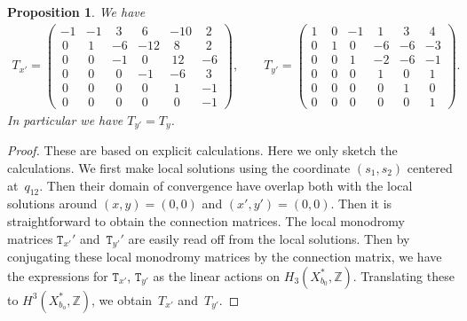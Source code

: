 \documentclass[10pt,a4paper]{amsart}
\numberwithin{equation}{section}
\newtheorem{Proposition}[Theorem]{Proposition}
\begin{document}
\begin{Proposition}\label{prop:Tx'-Ty'}We have
\begin{gather*}
T_{x'}=\left(\begin{smallmatrix}-1 & -1 & \,\,3 & \,\,6 & -10 & \,\,2\\
\,0 & \,1 & -6 & -12 & \,\,8 & \,\,2\\
\,0 & \,0 & -1 & \,\,0 & \,12 & -6\\
\,0 & \,0 & \,\,0 & -1 & -6 & \,\,3\\
\,0 & \,0 & \,\,0 & \,\,0 & \,\,1 & -1\\
\,0 & \,0 & \,\,0 & \,\,0 & \,\,0 & -1
\end{smallmatrix}\right),\qquad T_{y'}=\left(\begin{smallmatrix}1 & \,\,0 & -1 & \,\,1 & \,\,3 & \,\,4\\
0 & \,\,1 & \,0 & -6 & -6 & -3\\
0 & \,\,0 & \,1 & -2 & -6 & -1\\
0 & \,\,0 & \,0 & \,\,1 & \,\,0 & \,\,1\\
0 & \,\,0 & \,0 & \,\,0 & \,\,1 & \,\,0\\
0 & \,\,0 & \,0 & \,\,0 & \,\,0 & \,\,1
\end{smallmatrix}\right).
\end{gather*}
In particular we have $T_{y'}=T_{y}$. \end{Proposition}

\begin{proof} These are based on explicit calculations. Here we only sketch the calculations. We first make local solutions using the coordinate $(s_{1},s_{2})$ centered at~$q_{12}$. Then their domain of convergence have overlap both with the local solutions around $(x,y)=(0,0)$ and $(x',y')=(0,0)$. Then it is straightforward to obtain the connection matrices. The local monodromy matrices $\mathtt{T}_{x'}'$ and~$\mathtt{T}_{y'}'$ are easily read off from the local solutions. Then by conjugating these local monodromy matrices by the connection matrix, we have the expressions for $\mathtt{T}_{x'}$, $\mathtt{T}_{y'}$ as the linear actions on $H_{3}(X_{b_{0}}^{*},\mathbb{Z})$. Translating these to $H^{3}(X_{b_{o}}^{*},\mathbb{Z})$, we obtain~$T_{x'}$ and~$T_{y'}$.
\end{proof}
\end{document}
